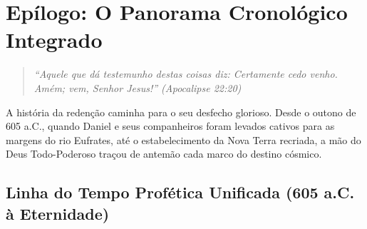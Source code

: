 \documentclass[11pt,a4paper,openany]{book}
\begin{document}
\chapter{Epílogo: O Panorama Cronológico Integrado}

\begin{quote}
\itshape
``Aquele que dá testemunho destas coisas diz: Certamente cedo venho. Amém; vem, Senhor Jesus!'' (Apocalipse 22:20)
\end{quote}

A história da redenção caminha para o seu desfecho glorioso. Desde o outono de 605 a.C., quando Daniel e seus companheiros foram levados cativos para as margens do rio Eufrates, até o estabelecimento da Nova Terra recriada, a mão do Deus Todo-Poderoso traçou de antemão cada marco do destino cósmico.

\section*{Linha do Tempo Profética Unificada (605 a.C. à Eternidade)}
\end{document}
